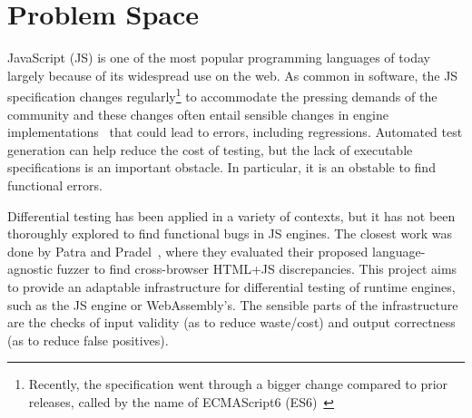 \documentclass[11pt]{article}
\newcommand{\eg}{e.g.}
\newcommand{\Comment}[1]{}
\begin{document}
\section{Problem Space}



JavaScript (JS) is one of the most popular programming languages of
today~\cite{business-insider,stackify} largely because of its
widespread use on the web. As common in software, the JS specification
changes regularly\footnote{Recently, the specification went through a
  bigger change compared to prior releases, called by the name of
  ECMAScript6 (ES6)~\cite{es6-features}} to accommodate the pressing
demands of the community and these changes often entail sensible
changes in engine implementations~\cite{kangax} that could lead to
errors, including regressions. Automated test generation can help reduce the
cost of testing, but the lack of executable specifications is an
important obstacle. In particular, it is an obstable to find functional errors.

\begin{center}
\end{center}

Differential testing\cite{McKeeman98differentialtesting} has been
applied in a variety of
contexts\cite{Brumley-etal-ss07,Yang-etal-pldi11,Chen-etal-fse2015,Argyros-etla-ccs16,Chen-etal-pldi16,petsios-etal-sp2017,SivakornAPKJ17},
but it has not been thoroughly explored to find functional bugs in JS
engines. The closest work was done by Patra and
Pradel~\cite{patra2016learning}, where they evaluated their proposed
language-agnostic fuzzer to find cross-browser HTML+JS
discrepancies. This project aims to provide an adaptable
infrastructure for differential testing of runtime engines, such as
the JS engine or WebAssembly's. The sensible parts of the
infrastructure are the checks of input validity (as to reduce
waste/cost) and output correctness (as to reduce false positives).
\end{document}
